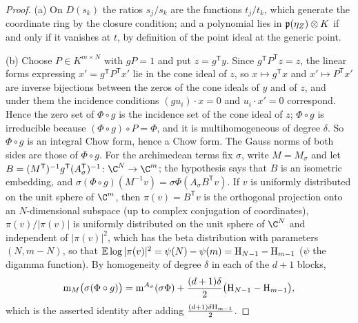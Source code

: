 \begin{proof}
(a) On $D(s_k)$ the ratios $s_j/s_k$ are the functions $t_j/t_k$, which generate the coordinate ring by
the closure condition; and a polynomial lies in $\mathfrak{p}(\eta_Z)\otimes K$ if and only if it vanishes at
$t$, by definition of the point ideal at the generic point.

(b) Choose $P\in K^{m\times N}$ with $gP=1$ and put $z=g^{\mathsf T}y$. Since $g^{\mathsf T}P^{\mathsf T}z=z$,
the linear forms expressing $x'=g^{\mathsf T}P^{\mathsf T}x'$ lie in the cone ideal of $z$, so
$x\mapsto g^{\mathsf T}x$ and $x'\mapsto P^{\mathsf T}x'$ are inverse bijections between the zeros of the
cone ideals of $y$ and of $z$, and under them the incidence conditions $(gu_i)\cdot x=0$ and
$u_i\cdot x'=0$ correspond. Hence the zero set of $\Phi\circ g$ is the incidence set of the cone ideal of
$z$; $\Phi\circ g$ is irreducible because $(\Phi\circ g)\circ P=\Phi$, and it is multihomogeneous of
degree $\delta$. So $\Phi\circ g$ is an integral Chow form, hence a Chow form. The Gauss norms of both
sides are those of $\Phi\circ g$. For the archimedean terms fix
$\sigma$, write $M=M_\sigma$ and let $B=(M^{\mathsf T})^{-1}g^{\mathsf T}(A_\sigma^{\mathsf T})^{-1}
\colon\C^N\to\C^m$; the hypothesis says that $B$ is an isometric embedding, and
$\sigma(\Phi\circ g)(M^{-1}v)=\sigma\Phi(A_\sigma B^{\mathsf T}v)$. If $v$ is uniformly distributed on
the unit sphere of $\C^m$, then $\pi(v)=B^{\mathsf T}v$ is the orthogonal projection onto an
$N$-dimensional subspace (up to complex conjugation of coordinates), $\pi(v)/|\pi(v)|$ is uniformly
distributed on the unit sphere of $\C^N$ and independent of $|\pi(v)|^2$, which has the beta
distribution with parameters $(N,m-N)$, so that $\mathbb E\log|\pi(v)|^2=\psi(N)-\psi(m)=
\mathrm{H}_{N-1}-\mathrm{H}_{m-1}$ ($\psi$ the digamma function). By homogeneity of degree $\delta$ in each
of the $d+1$ blocks,
\[
\operatorname{m}_M\bigl(\sigma(\Phi\circ g)\bigr)=\operatorname{m}^{A_\sigma}(\sigma\Phi)+
\frac{(d+1)\delta}2\bigl(\mathrm{H}_{N-1}-\mathrm{H}_{m-1}\bigr),
\]
which is the asserted identity after adding $\frac{(d+1)\delta\mathrm{H}_{m-1}}2$.
\end{proof}


